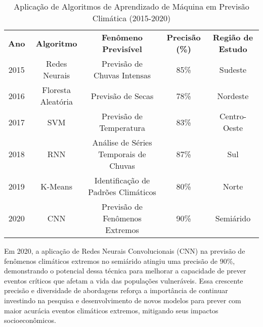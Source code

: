 \documentclass{projetodepesquisa} %
\begin{document}
	\begin{table}[ht]
		\centering
		\caption{Aplicação de Algoritmos de Aprendizado de Máquina em Previsão Climática (2015-2020)}
		\label{tab:algoritmos_ml_previsao_climatica}
		\begin{tabular}{|c|c|c|c|c|}
			\hline
			\multirow{2}{*}{\textbf{Ano}} & \multirow{2}{*}{\parbox{3cm}{\centering \textbf{Algoritmo}}} & \multirow{2}{*}{\parbox{4cm}{\centering \textbf{Fenômeno Previsível}}} & \multirow{2}{*}{\parbox{3cm}{\centering \textbf{Precisão (\%)}}} & \multirow{2}{*}{\parbox{3cm}{\centering \textbf{Região de Estudo}}} \\
			& & & & \\
			\hline
			\multirow{2}{*}{2015} & \multirow{2}{*}{Redes Neurais} & \multirow{2}{*}{\parbox{4cm}{\centering Previsão de Chuvas Intensas}} & \multirow{2}{*}{85\%} & \multirow{2}{*}{Sudeste} \\
			& & & & \\
			\hline
			\multirow{2}{*}{2016} & \multirow{2}{*}{Floresta Aleatória} & \multirow{2}{*}{Previsão de Secas} & \multirow{2}{*}{78\%} & \multirow{2}{*}{Nordeste} \\
			& & & & \\
			\hline
			\multirow{2}{*}{2017} & \multirow{2}{*}{SVM} & \multirow{2}{*}{Previsão de Temperatura} & \multirow{2}{*}{83\%} & \multirow{2}{*}{Centro-Oeste} \\
			& & & & \\
			\hline
			\multirow{2}{*}{2018} & \multirow{2}{*}{RNN} & \multirow{2}{*}{\parbox{4cm}{\centering Análise de Séries Temporais de Chuvas}} & \multirow{2}{*}{87\%} & \multirow{2}{*}{Sul} \\
			& & & & \\
			\hline
			\multirow{2}{*}{2019} & \multirow{2}{*}{K-Means} & \multirow{2}{*}{\parbox{4cm}{\centering Identificação de Padrões Climáticos}} & \multirow{2}{*}{80\%} & \multirow{2}{*}{Norte} \\
			& & & & \\
			\hline
			\multirow{2}{*}{2020} & \multirow{2}{*}{CNN} & \multirow{2}{*}{\parbox{4cm}{\centering Previsão de Fenômenos Extremos}} & \multirow{2}{*}{90\%} & \multirow{2}{*}{Semiárido} \\
			& & & & \\
			\hline
		\end{tabular}
	\end{table}
	
	Em 2020, a aplicação de Redes Neurais Convolucionais (CNN) na previsão de fenômenos climáticos extremos no semiárido atingiu uma precisão de 90\%, demonstrando o potencial dessa técnica para melhorar a capacidade de prever eventos críticos que afetam a vida das populações vulneráveis. Essa crescente precisão e diversidade de abordagens reforça a importância de continuar investindo na pesquisa e desenvolvimento de novos modelos para prever com maior acurácia eventos climáticos extremos, mitigando seus impactos socioeconômicos.
	
\end{document}
